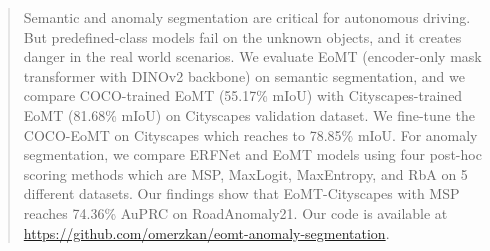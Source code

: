 \begin{abstract}

Semantic and anomaly segmentation are critical for autonomous driving. 
But predefined-class models fail on the unknown objects, and it creates danger in the real world scenarios. 
We evaluate EoMT (encoder-only mask transformer with DINOv2 backbone) on semantic segmentation, and we compare COCO-trained EoMT (55.17\% mIoU) with Cityscapes-trained EoMT (81.68\% mIoU) on Cityscapes validation dataset. 
We fine-tune the COCO-EoMT on Cityscapes which reaches to 78.85\% mIoU. 
For anomaly segmentation, we compare ERFNet and EoMT models using four post-hoc scoring methods which are MSP, MaxLogit, MaxEntropy, and RbA on 5 different datasets. 
Our findings show that EoMT-Cityscapes with MSP reaches 74.36\% AuPRC on RoadAnomaly21. 
Our code is available at \url{https://github.com/omerzkan/eomt-anomaly-segmentation}.

\end{abstract}

